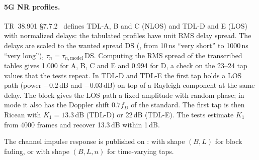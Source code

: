 \paragraph{5G NR profiles.} TR~38.901 \S7.7.2~\cite{tr38901} defines TDL-A, B and C (NLOS) and
TDL-D and E (LOS) with normalized delays: the tabulated profiles have unit RMS delay spread. The
delays are scaled to the wanted spread $\mathrm{DS}$ (, from 10\,ns
``very short'' to 1000\,ns ``very long''), $\tau_n=\tau_{n,\mathrm{model}}\,\mathrm{DS}$. Computing
the RMS spread of the transcribed tables gives 1.000 for A, B, C and E and 0.994 for D, a check on
the 23--24 tap values that the tests repeat. In TDL-D and TDL-E the first tap holds a LOS path
(power $-0.2$\,dB and $-0.03$\,dB) on top of a Rayleigh component at the same delay. The block
gives the LOS path a fixed amplitude with random phase; in  mode it also has the
Doppler shift $0.7f_D$ of the standard. The first tap is then Ricean with $K_1=13.3$\,dB (TDL-D) or
22\,dB (TDL-E). The tests estimate $K_1$ from 4000 frames and recover 13.3\,dB within 1\,dB.

The channel impulse response is published on :  with shape
$(B,L)$ for block fading, or  with shape $(B,L,n)$ for time-varying taps.

